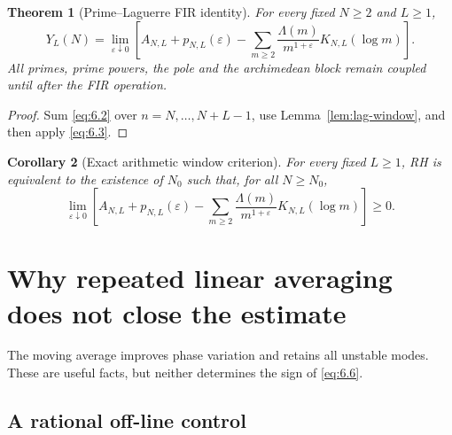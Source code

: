 \documentclass[11pt]{amsart}
\numberwithin{equation}{section}
\newtheorem{theorem}{Theorem}[section]
\newtheorem{corollary}[theorem]{Corollary}
\theoremstyle{definition}
\theoremstyle{remark}
\newcommand{\eps}{\varepsilon}
\begin{document}
\begin{theorem}[Prime--Laguerre FIR identity]
\label{thm:prime-fir}
For every fixed \(N\ge2\) and \(L\ge1\),
\begin{equation}
\boxed{
 Y_L(N)=\lim_{\eps\downarrow0}
 \left[
 A_{N,L}+p_{N,L}(\eps)
 -\sum_{m\ge2}\frac{\Lambda(m)}{m^{1+\eps}}
        K_{N,L}(\log m)
 \right].}                                              \label{eq:6.6}
\end{equation}
All primes, prime powers, the pole and the archimedean block remain coupled
until after the FIR operation.
\end{theorem}

\begin{proof}
Sum \eqref{eq:6.2} over \(n=N,\ldots,N+L-1\), use
Lemma~\ref{lem:lag-window}, and then apply \eqref{eq:6.3}.
\end{proof}

\begin{corollary}[Exact arithmetic window criterion]
\label{cor:arithmetic-window}
For every fixed \(L\ge1\), RH is equivalent to the existence of \(N_0\)
such that, for all \(N\ge N_0\),
\begin{equation}
 \lim_{\eps\downarrow0}
 \left[
 A_{N,L}+p_{N,L}(\eps)
 -\sum_{m\ge2}\frac{\Lambda(m)}{m^{1+\eps}}
        K_{N,L}(\log m)
 \right]\ge0.                                           \label{eq:6.7}
\end{equation}
\end{corollary}

\section{Why repeated linear averaging does not close the estimate}

The moving average improves phase variation and retains all unstable modes.
These are useful facts, but neither determines the sign of \eqref{eq:6.6}.

\subsection{A rational off-line control}
\end{document}
